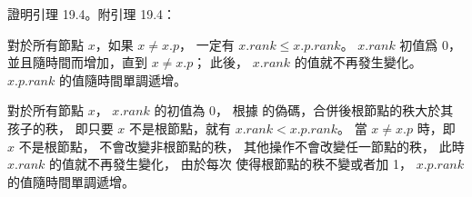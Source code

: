 \startEXERCISE
證明引理 19.4。附引理 19.4：

對於所有節點 $x$，如果 $x\ne x.p$，
一定有 $x.rank\le x.p.rank$。
$x.rank$ 初值爲 0，並且隨時間而增加，直到 $x\ne x.p$；
此後， $x.rank$ 的值就不再發生變化。
$x.p.rank$ 的值隨時間單調遞增。
\stopEXERCISE

\startANSWER
對於所有節點 $x$， $x.rank$ 的初值為 0，
根據  的偽碼，合併後根節點的秩大於其孩子的秩，
即只要 $x$ 不是根節點，就有 $x.rank < x.p.rank$。
當 $x\ne x.p$ 時，即 $x$ 不是根節點，
 不會改變非根節點的秩，
其他操作不會改變任一節點的秩，
此時 $x.rank$ 的值就不再發生變化，
由於每次  使得根節點的秩不變或者加 1，
$x.p.rank$ 的值隨時間單調遞增。
\stopANSWER
